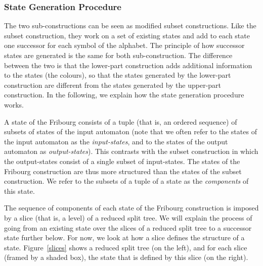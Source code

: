 \subsubsection{State Generation Procedure}
The two sub-constructions can be seen as modified subset constructions. Like the subset construction, they work on a set of existing states and add to each state one successor for each symbol of the alphabet. The principle of how successor states are generated is the same for both sub-construction. The difference between the two is that the lower-part construction adds additional information to the states (the colours), so that the states generated by the lower-part construction are different from the states generated by the upper-part construction. In the following, we explain how the state generation procedure works.

A state of the Fribourg consists of a tuple (that is, an ordered sequence) of subsets of states of the input automaton (note that we often refer to the states of the input automaton as the \textit{input-states}, and to the states of the output automaton as \textit{output-states}). This contrasts with the subset construction in which the output-states consist of a single subset of input-states. The states of the Fribourg construction are thus more structured than the states of the subset construction. We refer to the subsets of a tuple of a state as the \textit{components} of this state.

The sequence of components of each state of the Fribourg construction is imposed by a slice (that is, a level) of a reduced split tree. We will explain the process of going from an existing state over the slices of a reduced split tree to a successor state further below. For now, we look at how a slice defines the structure of a state. Figure~\ref{slices} shows a reduced split tree (on the left), and for each slice (framed by a shaded box), the state that is defined by this slice (on the right).

